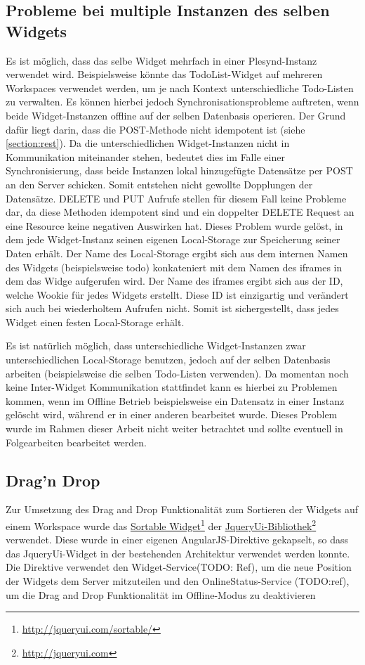 \subsection{Probleme bei multiple Instanzen des selben Widgets}
Es ist möglich, dass das selbe Widget mehrfach in einer Plesynd-Instanz verwendet wird. Beispielsweise könnte das TodoList-Widget auf mehreren Workspaces verwendet werden, um je nach Kontext unterschiedliche Todo-Listen zu verwalten. Es können hierbei jedoch Synchronisationsprobleme auftreten, wenn beide Widget-Instanzen offline auf der selben Datenbasis operieren. Der Grund dafür liegt darin, dass die POST-Methode nicht idempotent ist (siehe \ref{section:rest}). Da die unterschiedlichen Widget-Instanzen nicht in Kommunikation miteinander stehen, bedeutet dies im Falle einer Synchronisierung, dass beide Instanzen lokal hinzugefügte Datensätze per POST an den Server schicken. Somit entstehen nicht gewollte Dopplungen der Datensätze. DELETE und PUT Aufrufe stellen für diesem Fall keine Probleme dar, da diese Methoden idempotent sind und ein doppelter DELETE Request an eine Resource keine negativen Auswirken hat. Dieses Problem wurde gelöst, in dem jede Widget-Instanz seinen eigenen Local-Storage zur Speicherung seiner Daten erhält. Der Name des Local-Storage ergibt sich aus dem internen Namen des Widgets (beispielsweise todo) konkateniert mit dem Namen des iframes in dem das Widge aufgerufen wird. Der Name des iframes ergibt sich aus der ID, welche Wookie für jedes Widgets erstellt. Diese ID ist einzigartig und verändert sich auch bei wiederholtem Aufrufen nicht. Somit ist sichergestellt, dass jedes Widget einen festen Local-Storage erhält.

Es ist natürlich möglich, dass unterschiedliche Widget-Instanzen zwar unterschiedlichen Local-Storage benutzen, jedoch auf der selben Datenbasis arbeiten (beispielsweise die selben Todo-Listen verwenden). Da momentan noch keine Inter-Widget Kommunikation stattfindet kann es hierbei zu Problemen kommen, wenn im Offline Betrieb beispielsweise ein Datensatz in einer Instanz gelöscht wird, während er in einer anderen bearbeitet wurde. Dieses Problem wurde im Rahmen dieser Arbeit nicht weiter betrachtet und sollte eventuell in Folgearbeiten bearbeitet werden.

\subsection{Drag'n Drop}
Zur Umsetzung des Drag and Drop Funktionalität zum Sortieren der Widgets auf einem Workspace wurde das \href{http://jqueryui.com/sortable/}{Sortable Widget}\footnote{\url{http://jqueryui.com/sortable/}} der \href{http://jqueryui.com}{JqueryUi-Bibliothek}\footnote{\url{http://jqueryui.com}} verwendet. Diese wurde in einer eigenen AngularJS-Direktive gekapselt, so dass das JqueryUi-Widget in der bestehenden Architektur verwendet werden konnte. Die Direktive verwendet den Widget-Service(TODO: Ref), um die neue Position der Widgets dem Server mitzuteilen und den OnlineStatus-Service (TODO:ref), um die Drag and Drop Funktionalität im Offline-Modus zu deaktivieren

